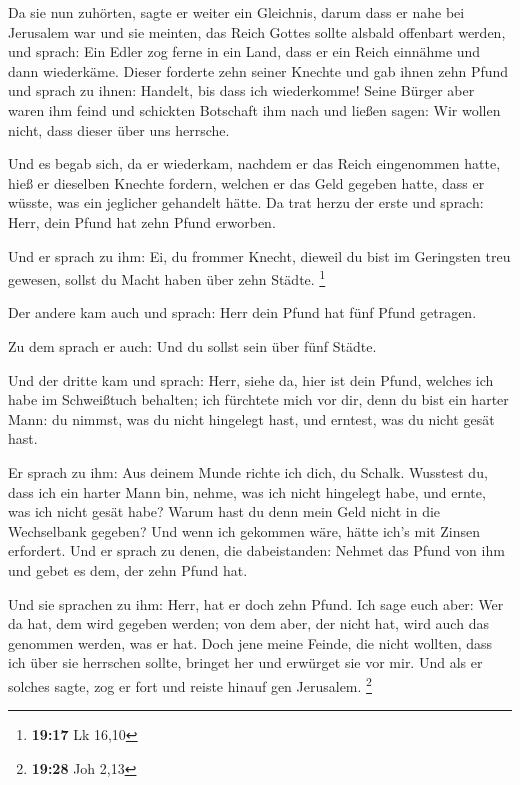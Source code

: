  Da sie nun zuhörten, sagte er weiter ein Gleichnis,
darum dass er nahe bei Jerusalem war und sie meinten, das Reich Gottes
sollte alsbald offenbart werden,  und sprach: Ein Edler
zog ferne in ein Land, dass er ein Reich einnähme und dann wiederkäme.
 Dieser forderte zehn seiner Knechte und gab ihnen zehn
Pfund und sprach zu ihnen: Handelt, bis dass ich wiederkomme!
 Seine Bürger aber waren ihm feind und schickten
Botschaft ihm nach und ließen sagen: Wir wollen nicht, dass dieser über
uns herrsche.

 Und es begab sich, da er wiederkam, nachdem er das Reich
eingenommen hatte, hieß er dieselben Knechte fordern, welchen er das
Geld gegeben hatte, dass er wüsste, was ein jeglicher gehandelt hätte.
 Da trat herzu der erste und sprach: Herr, dein Pfund hat
zehn Pfund erworben.

 Und er sprach zu ihm: Ei, du frommer Knecht, dieweil du
bist im Geringsten treu gewesen, sollst du Macht haben über zehn Städte.
\footnote{\textbf{19:17} Lk 16,10}

 Der andere kam auch und sprach: Herr dein Pfund hat fünf
Pfund getragen.

 Zu dem sprach er auch: Und du sollst sein über fünf
Städte.

 Und der dritte kam und sprach: Herr, siehe da, hier ist
dein Pfund, welches ich habe im Schweißtuch behalten; 
ich fürchtete mich vor dir, denn du bist ein harter Mann: du nimmst, was
du nicht hingelegt hast, und erntest, was du nicht gesät hast.

 Er sprach zu ihm: Aus deinem Munde richte ich dich, du
Schalk. Wusstest du, dass ich ein harter Mann bin, nehme, was ich nicht
hingelegt habe, und ernte, was ich nicht gesät habe? 
Warum hast du denn mein Geld nicht in die Wechselbank gegeben? Und wenn
ich gekommen wäre, hätte ich's mit Zinsen erfordert.  Und
er sprach zu denen, die dabeistanden: Nehmet das Pfund von ihm und gebet
es dem, der zehn Pfund hat.

 Und sie sprachen zu ihm: Herr, hat er doch zehn Pfund.
 Ich sage euch aber: Wer da hat, dem wird gegeben werden;
von dem aber, der nicht hat, wird auch das genommen werden, was er hat.
 Doch jene meine Feinde, die nicht wollten, dass ich über
sie herrschen sollte, bringet her und erwürget sie vor mir.
 Und als er solches sagte, zog er fort und reiste hinauf
gen Jerusalem. \footnote{\textbf{19:28} Joh 2,13}

